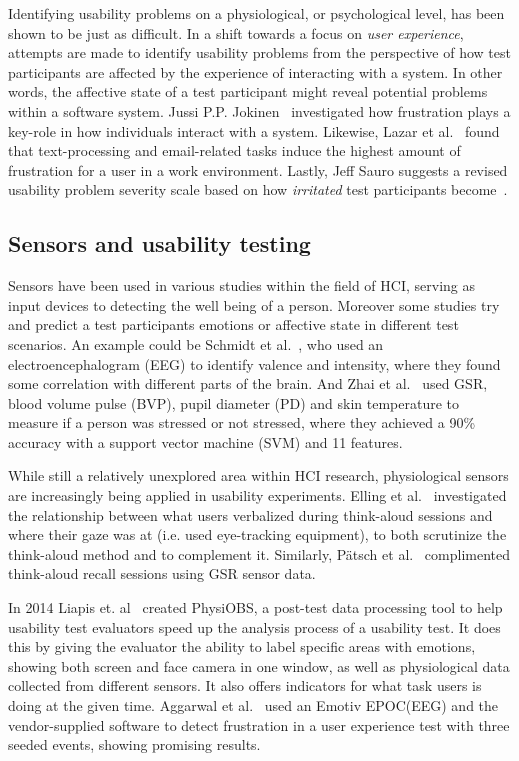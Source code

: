 Identifying usability problems on a physiological, or psychological level, has been shown to be just as difficult. In a
shift towards a focus on \textit{user experience}, attempts are made to identify usability problems
from the perspective of how test participants are affected by the experience of interacting with a system. In other
words, the affective state of a test participant might reveal potential problems within a software system. Jussi
P.P. Jokinen~\cite{workplace_up_study} investigated how frustration plays a key-role in how individuals interact with a
system. Likewise, Lazar et al.~\cite{frustration_with_computers} found that text-processing and email-related tasks
induce the highest amount of frustration for a user in a work environment. Lastly, Jeff Sauro suggests a revised usability problem severity scale based on how
\textit{irritated} test participants become~\cite{jeff_severity}.

\subsection{Sensors and usability testing}
Sensors have been used in various studies within the field of HCI, serving as input devices to detecting the well being of a person.
Moreover some studies try and predict a test participants emotions or affective state in different test scenarios. 
An example could be Schmidt et al.~\cite{schmidt_trainor}, who used an electroencephalogram (EEG) to identify valence and intensity, where they found some correlation with different parts of the brain.
And Zhai et al.~\cite{gsr_data_processing2} used GSR, blood volume pulse (BVP), pupil diameter (PD) and skin temperature to measure if a person was stressed or not stressed, where they achieved a 90\% accuracy with a support vector machine (SVM) and 11 features.

While still a relatively unexplored area within HCI research,
physiological sensors are increasingly being applied in usability experiments.
Elling et al.~\cite{concurrent_think_aloud_eye_tracking} investigated the
relationship between what users verbalized during think-aloud sessions and where
their gaze was at (i.e. used eye-tracking equipment), to both scrutinize the
think-aloud method and to complement it. Similarly, P\"{a}tsch et
al.~\cite{using_sensor_graphs_think_aloud} complimented think-aloud recall
sessions using GSR sensor data.

In 2014 Liapis et. al~\cite{fusion4} created PhysiOBS, a post-test data processing tool to help usability test evaluators speed up the analysis process of a usability test. It does this by giving the evaluator the ability to label specific areas with emotions, showing both screen and face camera in one window, as well as physiological data collected from different sensors. It also offers indicators for what task users is doing at the given time.
Aggarwal et al.~\cite{sensor_example} used an Emotiv EPOC(EEG) and the vendor-supplied software to detect frustration in a
user experience test with three seeded events, showing promising results.

